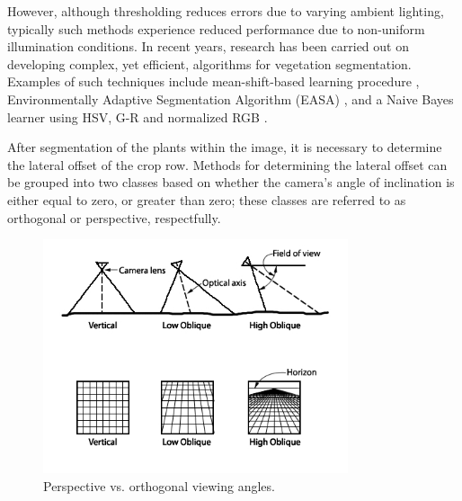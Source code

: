 \documentclass[authoryear]{elsarticle}
\begin{document}
However, although thresholding reduces errors due to varying ambient
lighting, typically such methods experience reduced performance due to
non-uniform illumination conditions. In recent years,
research has been carried out on developing complex, yet efficient,
algorithms for vegetation segmentation. Examples of such techniques
include mean-shift-based learning procedure \citep{zheng2009},
Environmentally Adaptive Segmentation Algorithm (EASA)
\citep{tian1998}, and a Naive Bayes learner using HSV, G-R and
normalized RGB \citet{moorthy2015}.  

After segmentation of the plants within the image, it is necessary to
determine the lateral offset of the crop row. Methods for determining
the lateral offset can be grouped into two classes based on whether
the camera’s angle of inclination is either equal to zero, or greater
than zero; these classes are referred to as orthogonal or perspective,
respectfully. 

\begin{figure}
  \centering
  \includegraphics[width=0.8\textwidth,natwidth=610,natheight=642]{oblique_projection.jpg}
  \caption{Perspective vs. orthogonal viewing angles.}
  \label{fig:projection}
\end{figure}
\end{document}
